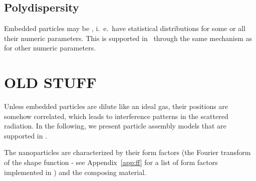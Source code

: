 
\subsection{Polydispersity}

%
%
%
%
Embedded particles may be , i.~e.\ have statistical distributions
for some or all their numeric parameters.
This is supported in \BornAgain\ through the same mechanism
as for other numeric parameters.




\iffalse
\section{OLD STUFF}

Unless embedded particles are dilute like an ideal gas,
their positions are somehow correlated,
which leads to interference patterns in the scattered radiation.
In the following,
we present particle assembly models that are supported in \BornAgain.


The nanoparticles are characterized by their form factors
(\idest the Fourier transform of the shape function - see Appendix~\ref{app:ff} for a list of form factors implemented in \BornAgain) and the composing material.



